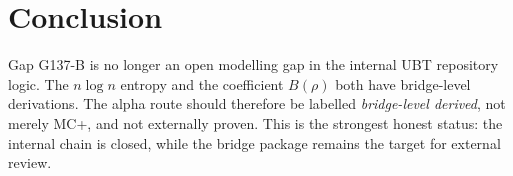 \documentclass[12pt,a4paper]{article}
\begin{document}
\section{Conclusion}

Gap G137-B is no longer an open modelling gap in the internal UBT repository
logic.  The $n\log n$ entropy and the coefficient $B(\rho)$ both have
bridge-level derivations.  The alpha route should therefore be labelled
\emph{bridge-level derived}, not merely MC+, and not externally proven.  This is
the strongest honest status: the internal chain is closed, while the bridge
package remains the target for external review.
\end{document}
